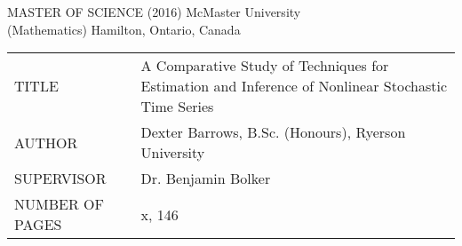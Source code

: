 \newpage
\thispagestyle{empty}
\centering
\null


MASTER OF SCIENCE (2016) 	\hfill 	McMaster University \\
(Mathematics)				\hfill	Hamilton, Ontario, Canada \\

\vspace{3cm}

\begin{tabular}{p{5cm}p{10cm}}
	TITLE 			& A Comparative Study of Techniques for Estimation and Inference of Nonlinear Stochastic Time Series \\
	AUTHOR 			& Dexter Barrows, B.Sc. (Honours), Ryerson University \\
	SUPERVISOR 		& Dr. Benjamin Bolker \\
	NUMBER OF PAGES & x, 146 \\
\end{tabular}